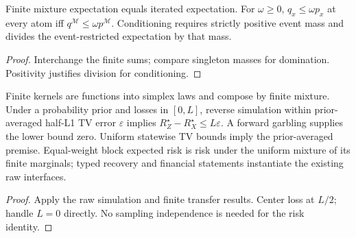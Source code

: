 \begin{theorem}\label{thm:finite-mixtures}
  \leanok
  Finite mixture expectation equals iterated expectation. For $\omega\ge0$,
  $q_x\le\omega p_x$ at every atom iff
  $q^{\mathcal M}\le\omega p^{\mathcal M}$. Conditioning requires strictly
  positive event mass and divides the event-restricted expectation by that mass.
\end{theorem}
\begin{proof}\leanok
  Interchange the finite sums; compare singleton masses for domination.
  Positivity justifies division for conditioning.
\end{proof}

\begin{theorem}\label{thm:finite-typed-simulation}
  \leanok
  Finite kernels are functions into simplex laws and compose by finite mixture.
  Under a probability prior and losses in $[0,L]$, reverse simulation within
  prior-averaged half-L1 TV error $\varepsilon$ implies
  $R_Z^\star-R_X^\star\le L\varepsilon$. A forward garbling supplies the lower
  bound zero. Uniform statewise TV bounds imply the prior-averaged premise.
  Equal-weight block expected risk is risk under the uniform mixture of its
  finite marginals; typed recovery and financial statements instantiate the
  existing raw interfaces.
\end{theorem}
\begin{proof}\leanok
  Apply the raw simulation and finite transfer results. Center loss at $L/2$;
  handle $L=0$ directly. No sampling independence is needed for the
  risk identity.
\end{proof}

